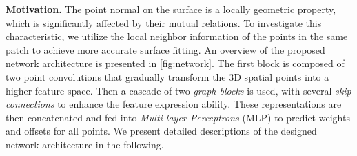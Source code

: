 \documentclass[runningheads]{llncs}
\begin{document}
\noindent\textbf{{Motivation.}}\label{sec:leran-graph}
The point normal on the surface is a locally geometric property, which is significantly affected by their mutual relations. To investigate this characteristic, we utilize the local neighbor information of the points in the same patch to achieve more accurate surface fitting. An overview of the proposed network architecture is presented in \cref{fig:network}. The first block is composed of two point convolutions that gradually transform the 3D spatial points into a higher feature space. Then a cascade
of two \emph{graph blocks} is used, with several \emph{skip connections} to enhance the feature expression ability. These representations are then concatenated and fed into \textit{Multi-layer Perceptrons} (MLP) to predict weights and offsets for all points. We present detailed descriptions of the designed network architecture in the following.
\end{document}
